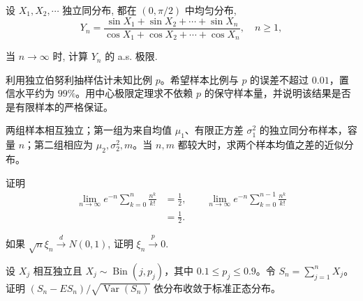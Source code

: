 \begin{exercise}[三角函数样本均值之比]\label{q:A7.10}
设 $X_1,X_2,\cdots$ 独立同分布, 都在 $(0,\pi/2)$ 中均匀分布,
    \[Y_n=\dfrac{\sin X_1+\sin X_2+\cdots+\sin X_n}{\cos X_1+\cos X_2+\cdots+\cos X_n},\quad n\geq1,\]
    
    当 $n\to\infty$ 时, 计算 $Y_n$ 的 a.s. 极限.\par{}\end{exercise}

\begin{exercise}[比例调查的样本量]\label{q:A7.14}
利用独立伯努利抽样估计未知比例 $p$。希望样本比例与 $p$ 的误差不超过 $0.01$，置信水平约为 $99\%$。用中心极限定理求不依赖 $p$ 的保守样本量，并说明该结果是否是有限样本的严格保证。\par{}\end{exercise}

\begin{exercise}[两组样本均值差的近似]\label{q:A7.15}
两组样本相互独立；第一组为来自均值 $\mu_1$、有限正方差 $\sigma_1^2$ 的独立同分布样本，容量 $n$；第二组相应为 $\mu_2,\sigma_2^2,m$。当 $n,m$ 都较大时，求两个样本均值之差的近似分布。\par{}\end{exercise}

\begin{exercise}[泊松概率和的二分极限]\label{q:A7.20}
证明\[\begin{aligned}\lim_{n\to\infty}e^{-n}\sum_{k=0}^{n}\frac{n^k}{k!}&=\frac12,\qquad\lim_{n\to\infty}e^{-n}\sum_{k=0}^{n-1}\frac{n^k}{k!}\\&=\frac12.\end{aligned}\]\par{}\end{exercise}

\begin{exercise}[缩放收敛与紧性]\label{q:A7.21}
如果 $\sqrt{n}\xi_n\xrightarrow{d}N(0,1)$, 证明 $\xi_n\xrightarrow{p}0$.\par{}\end{exercise}

\begin{exercise}[不同参数二项和的极限]\label{q:A7.22}
设 $X_j$ 相互独立且 $X_j\sim\operatorname{Bin}(j,p_j)$，其中 $0.1\le p_j\le0.9$。令 $S_n=\sum_{j=1}^nX_j$。证明 $(S_n-ES_n)/\sqrt{\operatorname{Var}(S_n)}$ 依分布收敛于标准正态分布。\par{}\end{exercise}

